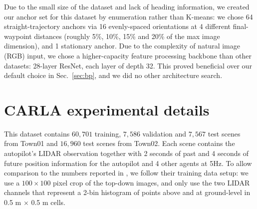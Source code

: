 \documentclass{article}
\begin{document}
Due to the small size of the dataset and lack of heading information, we created our anchor set for this dataset by enumeration rather than K-means: we chose 64 straight-trajectory anchors via 16 evenly-spaced orientations at 4 different final-waypoint distances (roughly 5\%, 10\%, 15\% and 20\% of the max image dimension), and 1 stationary anchor. Due to the complexity of natural image (RGB) input, we chose a higher-capacity feature processing backbone than other datasets: 28-layer ResNet, each layer of depth 32.  This proved beneficial over our default choice in Sec.~\ref{sec:bp}, and we did no other architecture search.


\section{CARLA experimental details}
\label{sec:carla_experiment_setup}

This dataset contains $60,701$ training, $7,586$ validation and $7,567$ test scenes from Town01 and $16,960$ test scenes from Town02. Each scene contains the autopilot's LIDAR observation together with 2 seconds of past and 4 seconds of future position information for the autopilot and 4 other agents at 5Hz. To allow comparison to the numbers reported in \cite{Rhinehart19}, we follow their training data setup: we use a $100\times100$ pixel crop of the top-down images, and only use the two LIDAR channels that represent a 2-bin histogram of points above and at ground-level in 0.5 m $\times$ 0.5 m cells.  
 
\end{document}
